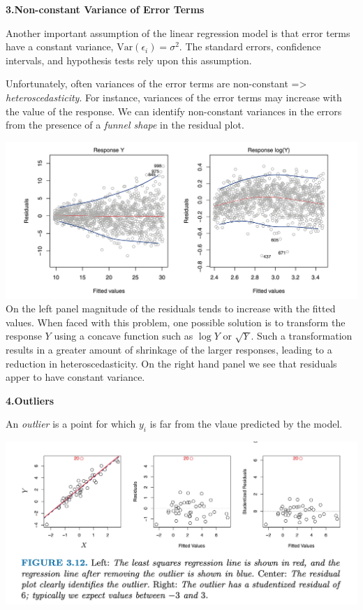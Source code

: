 \documentclass[
  letterpaper,
  DIV=11,
  numbers=noendperiod]{scrreprt}
\begin{document}
\textbf{3.Non-constant Variance of Error Terms}

Another important assumption of the linear regression model is that
error terms have a constant variance,
\(\text{Var}(\epsilon_i) = \sigma^2\). The standard errors, confidence
intervals, and hypothesis tests rely upon this assumption.

Unfortunately, often variances of the error terms are non-constant
=\textgreater{} \emph{heteroscedasticity}. For instance, variances of
the error terms may increase with the value of the response. We can
identify non-constant variances in the errors from the presence of a
\emph{funnel shape} in the residual plot.

\includegraphics{fig3.11.png} On the left panel magnitude of the
residuals tends to increase with the fitted values. When faced with this
problem, one possible solution is to transform the response \(Y\) using
a concave function such as \(\log Y\) or \(\sqrt{Y}\). Such a
transformation results in a greater amount of shrinkage of the larger
responses, leading to a reduction in heteroscedasticity. On the right
hand panel we see that residuals apper to have constant variance.

\textbf{4.Outliers}

An \emph{outlier} is a point for which \(y_i\) is far from the vlaue
predicted by the model.

\includegraphics{fig3.12.png}
\end{document}

